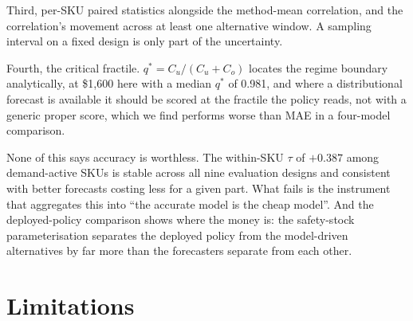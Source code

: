 \documentclass[11pt]{article}
\begin{document}
Third, per-SKU paired statistics alongside the method-mean correlation, and
the correlation's movement across at least one alternative window. A sampling
interval on a fixed design is only part of the uncertainty.

Fourth, the critical fractile. $q^\ast = C_u/(C_u+C_o)$ locates the regime
boundary analytically, at \$1{,}600 here with a median $q^\ast$ of 0.981, and
where a distributional forecast is available it should be scored at the
fractile the policy reads, not with a generic proper score, which we find
performs worse than MAE in a four-model comparison.

None of this says accuracy is worthless. The within-SKU $\tau$ of $+0.387$
among demand-active SKUs is stable across all nine evaluation designs and
consistent with better forecasts costing less for a given part. What fails is
the instrument that aggregates this into ``the accurate model is the cheap
model''. And the deployed-policy comparison shows where the money is: the
safety-stock parameterisation separates the deployed policy from the
model-driven alternatives by far more than the forecasters separate from each
other.

\section{Limitations}
\end{document}
